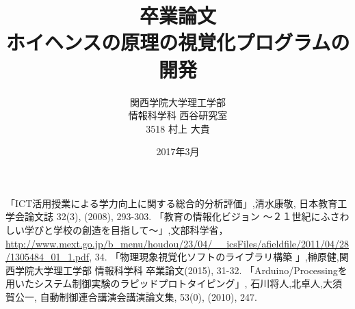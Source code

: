 \documentclass[12pt,a4]{jreport}%
\title{卒業論文\\ホイヘンスの原理の視覚化プログラムの開発}
\author{関西学院大学理工学部\\情報科学科 西谷研究室\\3518 村上 大貴}
\date{2017年3月}
\begin{document}
\maketitle
\newpage



\tableofcontents





\begin{thebibliography}{9}
「ICT活用授業による学力向上に関する総合的分析評価」,清水康敬, 日本教育工学会論文誌 32(3), (2008), 293-303.
「教育の情報化ビジョン 〜２１世紀にふさわしい学びと学校の創造を目指して〜」,文部科学省，\url{http://www.mext.go.jp/b_menu/houdou/23/04/__icsFiles/afieldfile/2011/04/28/1305484_01_1.pdf}, 34.
「物理現象視覚化ソフトのライブラリ構築 」,榊原健,関西学院大学理工学部 情報科学科 卒業論文(2015), 31-32.
 「Arduino/Processingを用いたシステム制御実験のラピッドプロトタイピング」, 石川将人,北卓人,大須賀公一, 自動制御連合講演会講演論文集, 53(0), (2010), 247.
\end{thebibliography}
\end{document}
